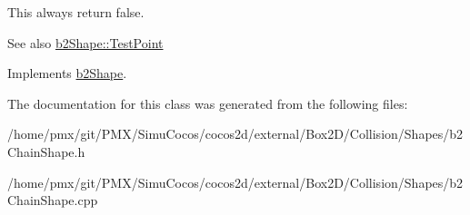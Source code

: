 This always return false. \begin{DoxySeeAlso}{See also}
\hyperlink{classb2Shape_a6ac968e403e2d93e8ae46d728a2e50fa}{b2\+Shape\+::\+Test\+Point} 
\end{DoxySeeAlso}


Implements \hyperlink{classb2Shape_a6ac968e403e2d93e8ae46d728a2e50fa}{b2\+Shape}.



The documentation for this class was generated from the following files\+:\begin{DoxyCompactItemize}
\item 
/home/pmx/git/\+P\+M\+X/\+Simu\+Cocos/cocos2d/external/\+Box2\+D/\+Collision/\+Shapes/b2\+Chain\+Shape.\+h\item 
/home/pmx/git/\+P\+M\+X/\+Simu\+Cocos/cocos2d/external/\+Box2\+D/\+Collision/\+Shapes/b2\+Chain\+Shape.\+cpp\end{DoxyCompactItemize}
